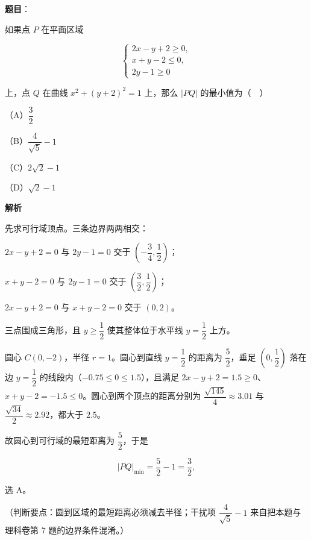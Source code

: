 \begin{answer}

\textbf{题目}：

如果点 $P$ 在平面区域

\nopagebreak[4]
\[\begin{cases}2x-y+2\geqslant 0,\\ x+y-2\leqslant 0,\\ 2y-1\geqslant 0\end{cases}\]

上，点 $Q$ 在曲线 $x^2+(y+2)^2=1$ 上，那么 $|PQ|$ 的最小值为（　）

（A）$\dfrac32$

（B）$\dfrac{4}{\sqrt5}-1$

（C）$2\sqrt2-1$

（D）$\sqrt2-1$

\textbf{解析}

先求可行域顶点。三条边界两两相交：

$2x-y+2=0$ 与 $2y-1=0$ 交于 $\left(-\dfrac34,\dfrac12\right)$；

$x+y-2=0$ 与 $2y-1=0$ 交于 $\left(\dfrac32,\dfrac12\right)$；

$2x-y+2=0$ 与 $x+y-2=0$ 交于 $(0,2)$。

三点围成三角形，且 $y\geqslant\dfrac12$ 使其整体位于水平线 $y=\dfrac12$ 上方。

圆心 $C(0,-2)$，半径 $r=1$。圆心到直线 $y=\dfrac12$ 的距离为 $\dfrac52$，垂足 $\left(0,\dfrac12\right)$ 落在边 $y=\dfrac12$ 的线段内（$-0.75\leqslant0\leqslant1.5$），且满足 $2x-y+2=1.5\geqslant0$、$x+y-2=-1.5\leqslant0$。圆心到两个顶点的距离分别为 $\dfrac{\sqrt{145}}{4}\approx3.01$ 与 $\dfrac{\sqrt{34}}{2}\approx2.92$，都大于 $2.5$。

故圆心到可行域的最短距离为 $\dfrac52$，于是

\nopagebreak[4]
\[|PQ|_{\min}=\frac52-1=\frac32,\]

选 A。

（判断要点：圆到区域的最短距离必须减去半径；干扰项 $\dfrac{4}{\sqrt5}-1$ 来自把本题与理科卷第 7 题的边界条件混淆。）


\end{answer}
